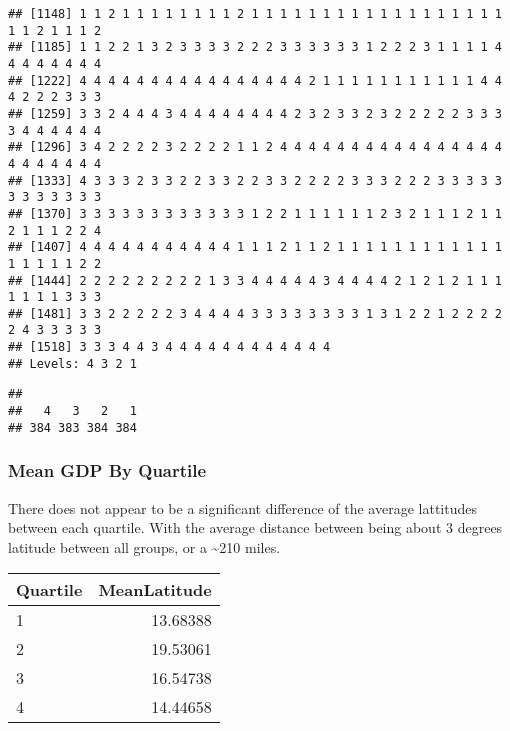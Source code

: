 \documentclass[
]{article}
\newenvironment{Shaded}{\begin{snugshade}}{\end{snugshade}}
\newcommand{\ControlFlowTok}[1]{\textcolor[rgb]{0.13,0.29,0.53}{\textbf{#1}}}
\newcommand{\DataTypeTok}[1]{\textcolor[rgb]{0.13,0.29,0.53}{#1}}
\newcommand{\KeywordTok}[1]{\textcolor[rgb]{0.13,0.29,0.53}{\textbf{#1}}}
\newcommand{\NormalTok}[1]{#1}
\newcommand{\OperatorTok}[1]{\textcolor[rgb]{0.81,0.36,0.00}{\textbf{#1}}}
\newcommand{\StringTok}[1]{\textcolor[rgb]{0.31,0.60,0.02}{#1}}
\begin{document}
\begin{verbatim}
## [1148] 1 1 2 1 1 1 1 1 1 1 1 2 1 1 1 1 1 1 1 1 1 1 1 1 1 1 1 1 1 1 1 1 2 1 1 1 2
## [1185] 1 1 2 2 1 3 2 3 3 3 3 2 2 2 3 3 3 3 3 3 1 2 2 2 3 1 1 1 1 4 4 4 4 4 4 4 4
## [1222] 4 4 4 4 4 4 4 4 4 4 4 4 4 4 4 4 2 1 1 1 1 1 1 1 1 1 1 1 4 4 4 2 2 2 3 3 3
## [1259] 3 3 2 4 4 4 3 4 4 4 4 4 4 4 4 2 3 2 3 3 2 3 2 2 2 2 2 3 3 3 3 4 4 4 4 4 4
## [1296] 3 4 2 2 2 2 3 2 2 2 2 1 1 2 4 4 4 4 4 4 4 4 4 4 4 4 4 4 4 4 4 4 4 4 4 4 4
## [1333] 4 3 3 3 2 3 3 2 2 3 3 2 2 3 3 2 2 2 2 3 3 3 2 2 2 3 3 3 3 3 3 3 3 3 3 3 3
## [1370] 3 3 3 3 3 3 3 3 3 3 3 3 1 2 2 1 1 1 1 1 1 2 3 2 1 1 1 2 1 1 2 1 1 1 2 2 4
## [1407] 4 4 4 4 4 4 4 4 4 4 4 1 1 1 2 1 1 2 1 1 1 1 1 1 1 1 1 1 1 1 1 1 1 1 1 2 2
## [1444] 2 2 2 2 2 2 2 2 2 1 3 3 4 4 4 4 4 3 4 4 4 4 2 1 2 1 2 1 1 1 1 1 1 1 3 3 3
## [1481] 3 3 2 2 2 2 2 3 4 4 4 4 3 3 3 3 3 3 3 3 1 3 1 2 2 1 2 2 2 2 2 4 3 3 3 3 3
## [1518] 3 3 3 4 4 3 4 4 4 4 4 4 4 4 4 4 4 4
## Levels: 4 3 2 1
\end{verbatim}

\begin{verbatim}
## 
##   4   3   2   1 
## 384 383 384 384
\end{verbatim}

\hypertarget{mean-gdp-by-quartile}{%
\subsubsection{Mean GDP By Quartile}\label{mean-gdp-by-quartile}}

There does not appear to be a significant difference of the average
lattitudes between each quartile. With the average distance between
being about 3 degrees latitude between all groups, or a
\textasciitilde210 miles.

\begin{Shaded}
\end{Shaded}

\begin{longtable}[]{@{}lr@{}}
\toprule
Quartile & MeanLatitude\tabularnewline
\midrule
\endhead
1 & 13.68388\tabularnewline
2 & 19.53061\tabularnewline
3 & 16.54738\tabularnewline
4 & 14.44658\tabularnewline
\bottomrule
\end{longtable}
\end{document}
